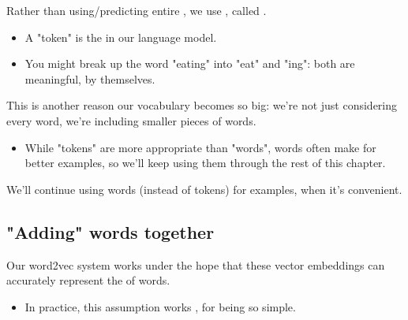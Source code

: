         \begin{clarification}
            Rather than using/predicting entire , we use , called .

            \begin{itemize}
                \item A "token" is the  in our language model.
            \end{itemize}
        \end{clarification}

        \begin{itemize}
            \item \miniex You might break up the word "eating" into "eat" and "ing": both are meaningful, by themselves.
        \end{itemize}

        This is another reason our vocabulary becomes so big: we're not just considering every word, we're including smaller pieces of words.

        \begin{itemize}
            \item While "tokens" are more appropriate than "words", words often make for better examples, so we'll keep using them through the rest of this chapter.\\
        \end{itemize}

        \begin{clarification}
            We'll continue using words (instead of tokens) for examples, when it's convenient.
        \end{clarification}

         





    

    \pagebreak
    
    \subsection{"Adding" words together}

        Our word2vec system works under the hope that these vector embeddings can accurately represent the  of words.

        \begin{itemize}
            \item In practice, this assumption works , for being so simple.
        \end{itemize}

